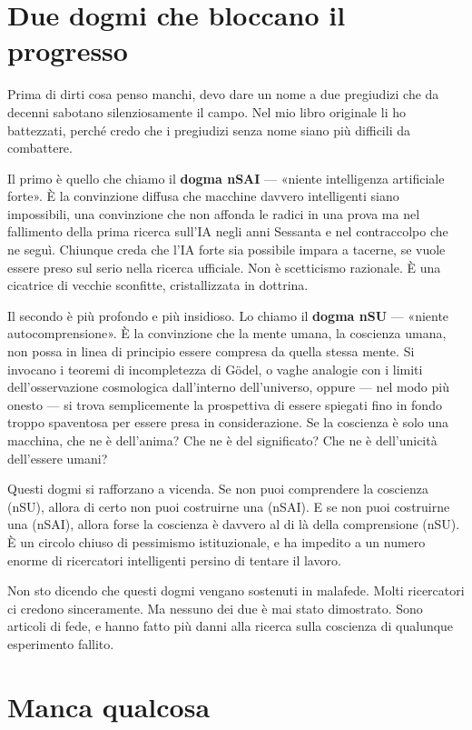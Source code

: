 \documentclass[11pt, twoside, openright]{book}
\begin{document}
\section*{Due dogmi che bloccano il progresso}

Prima di dirti cosa penso manchi, devo dare un nome a due pregiudizi che da decenni sabotano silenziosamente il campo. Nel mio libro originale li ho battezzati, perché credo che i pregiudizi senza nome siano più difficili da combattere.

Il primo è quello che chiamo il \textbf{dogma nSAI} --- «niente intelligenza artificiale forte». È la convinzione diffusa che macchine davvero intelligenti siano impossibili, una convinzione che non affonda le radici in una prova ma nel fallimento della prima ricerca sull'IA negli anni Sessanta e nel contraccolpo che ne seguì. Chiunque creda che l'IA forte sia possibile impara a tacerne, se vuole essere preso sul serio nella ricerca ufficiale. Non è scetticismo razionale. È una cicatrice di vecchie sconfitte, cristallizzata in dottrina.

Il secondo è più profondo e più insidioso. Lo chiamo il \textbf{dogma nSU} --- «niente autocomprensione». È la convinzione che la mente umana, la coscienza umana, non possa in linea di principio essere compresa da quella stessa mente. Si invocano i teoremi di incompletezza di Gödel, o vaghe analogie con i limiti dell'osservazione cosmologica dall'interno dell'universo, oppure --- nel modo più onesto --- si trova semplicemente la prospettiva di essere spiegati fino in fondo troppo spaventosa per essere presa in considerazione. Se la coscienza è solo una macchina, che ne è dell'anima? Che ne è del significato? Che ne è dell'unicità dell'essere umani?

Questi dogmi si rafforzano a vicenda. Se non puoi comprendere la coscienza (nSU), allora di certo non puoi costruirne una (nSAI). E se non puoi costruirne una (nSAI), allora forse la coscienza è davvero al di là della comprensione (nSU). È un circolo chiuso di pessimismo istituzionale, e ha impedito a un numero enorme di ricercatori intelligenti persino di tentare il lavoro.

Non sto dicendo che questi dogmi vengano sostenuti in malafede. Molti ricercatori ci credono sinceramente. Ma nessuno dei due è mai stato dimostrato. Sono articoli di fede, e hanno fatto più danni alla ricerca sulla coscienza di qualunque esperimento fallito.

\section*{Manca qualcosa}
\end{document}
